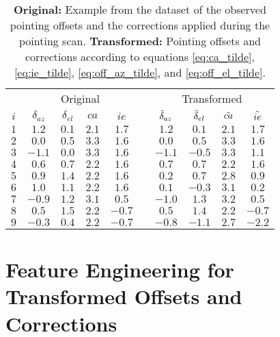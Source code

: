\begin{table}[H]
    \centering
    \caption{\textbf{Original:} Example from the dataset of the observed pointing offsets and the corrections applied during the pointing scan.
    \textbf{Transformed:} Pointing offsets and corrections according to equations \eqref{eq:ca_tilde}, \eqref{eq:ie_tilde}, \eqref{eq:off_az_tilde}, and \eqref{eq:off_el_tilde}.}
    \label{tab:offset_and_corrections}
    \begin{tabular}{c cccc c cccc}
    \toprule
    \multicolumn{1}{c}{} & \multicolumn{4}{c}{Original} & \multicolumn{1}{c}{} & \multicolumn{4}{c}{Transformed} \\
    \cmidrule(lr){2-5} \cmidrule(lr){7-10} 
    $i$ &  $\delta_{az}$ &  $\delta_{el}$ &  $ca$ & $ie$  & & $\Tilde{\delta}_{az}$ &  $\Tilde{\delta}_{el}$ &  $\Tilde{ca}$ &  $\Tilde{ie}$ \\
    \midrule
    $1$ &     $1.2$ & $0.1$ & $2.1$ &  $1.7$ &   &    $1.2$ &       $0.1$ &       $2.1$ &       $1.7$ \\
    $2$ &     $0.0$ & $0.5$ & $3.3$ &  $1.6$ &   &    $0.0$ &       $0.5$ &       $3.3$ &       $1.6$ \\
    $3$ &    $-1.1$ & $0.0$ & $3.3$ &  $1.6$ &   &   $-1.1$ &      $-0.5$ &       $3.3$ &       $1.1$ \\
    $4$ &     $0.6$ & $0.7$ & $2.2$ &  $1.6$ &   &    $0.7$ &       $0.7$ &       $2.2$ &       $1.6$ \\
    $5$ &     $0.9$ & $1.4$ & $2.2$ &  $1.6$ &   &    $0.2$ &       $0.7$ &       $2.8$ &       $0.9$ \\
    $6$ &     $1.0$ & $1.1$ & $2.2$ &  $1.6$ &   &    $0.1$ &      $-0.3$ &       $3.1$ &       $0.2$ \\
    $7$ &    $-0.9$ & $1.2$ & $3.1$ &  $0.5$ &   &   $-1.0$ &       $1.3$ &       $3.2$ &       $0.5$ \\
    $8$ &     $0.5$ & $1.5$ & $2.2$ & $-0.7$ &   &    $0.5$ &       $1.4$ &       $2.2$ &      $-0.7$ \\
    $9$ &    $-0.3$ & $0.4$ & $2.2$ & $-0.7$ &   &   $-0.8$ &      $-1.1$ &       $2.7$ &      $-2.2$ \\
    \bottomrule
    \end{tabular}
\end{table}

\section{Feature Engineering for Transformed Offsets and Corrections}
